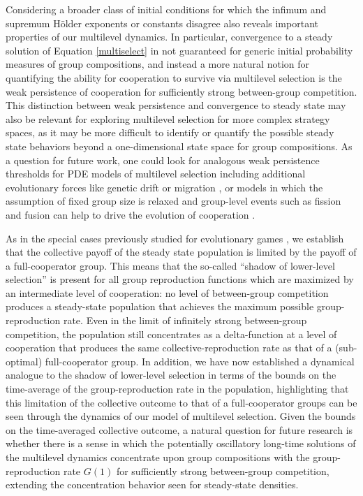 \documentclass[11pt]{article}
\numberwithin{equation}{section}
\newcommand{\myindent}{\hspace{10mm}}
\begin{document}
{\myindent Considering a broader class of initial conditions for which the infimum and supremum H{\"o}lder exponents or constants disagree also reveals important properties of our multilevel dynamics. In particular, convergence to a steady solution of Equation \eqref{multiselect} in not guaranteed for generic initial probability measures of group compositions, and instead a more natural notion for quantifying the ability for cooperation to survive via multilevel selection is the weak persistence of cooperation for sufficiently strong between-group competition. This distinction between weak persistence and convergence to steady state may also be relevant for exploring multilevel selection for more complex strategy spaces, as it may be more difficult to identify or quantify the possible steady state behaviors beyond a one-dimensional state space for group compositions. As a question for future work, one could look for analogous weak persistence thresholds for PDE models of multilevel selection including additional evolutionary forces like genetic drift or migration \cite{ogura1987stationary,ogura1987stationary2,fontanari2013solvable,fontanari2014effect,fontanari2014nonlinear}, or models in which the assumption of fixed group size is relaxed and group-level events such as fission and fusion can help to drive the evolution of cooperation \cite{simon2010dynamical,simon2012numerical,simon2013towards,simon2016group}.

\myindent  As in the special cases previously studied for evolutionary games \cite{cooney2019replicator,cooney2020analysis}, we establish that the collective payoff of the steady state population is limited by the payoff of a full-cooperator group. This means that the so-called ``shadow of lower-level selection'' is present for all group reproduction functions which are maximized by an intermediate level of cooperation: no level of between-group competition produces a steady-state population that achieves the maximum possible group-reproduction rate.
Even in the limit of infinitely strong between-group competition, the population still concentrates as a delta-function at a level of cooperation that produces the same collective-reproduction rate as that of a (sub-optimal) full-cooperator group. In addition, we have now established a dynamical analogue to the shadow of lower-level selection in terms of the bounds on the time-average of the group-reproduction rate in the population, highlighting that this limitation of the collective outcome to that of a full-cooperator groups can be seen through the dynamics of our model of multilevel selection. Given the bounds on the time-averaged collective outcome, a natural question for future research is whether there is a sense in which the potentially oscillatory long-time solutions of the multilevel dynamics concentrate upon group compositions with the group-reproduction rate $G(1)$ for sufficiently strong between-group competition, extending the concentration behavior seen for steady-state densities. 

}
\end{document}
